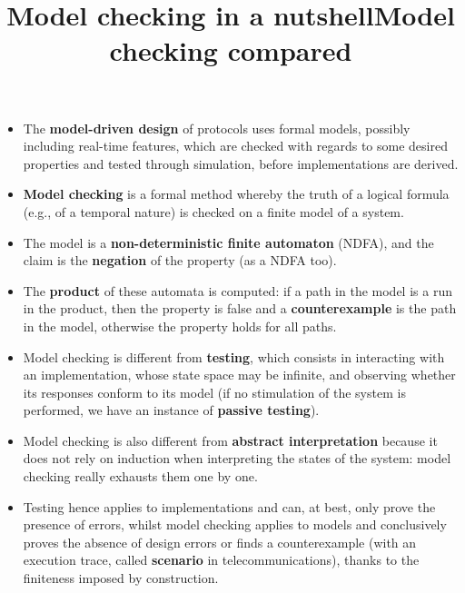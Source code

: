 \documentclass[wide]{slides}
\begin{document}
\begin{slide}
  \title{Model checking in a nutshell}

  \begin{itemize}

    \item The \textbf{model-driven design} of protocols uses formal
      models, possibly including real\hyp{}time features, which are
      checked with regards to some desired properties and tested
      through simulation, before implementations are derived.

    \item \textbf{Model checking} is a formal method whereby the truth
      of a logical formula (e.g., of a temporal nature) is checked on
      a finite model of a system.

    \item The model is a \textbf{non\hyp{}deterministic finite
      automaton} (NDFA), and the claim is the \textbf{negation} of the
      property (as a NDFA too).

    \item The \textbf{product} of these automata is computed: if a
      path in the model is a run in the product, then the property is
      false and a \textbf{counterexample} is the path in the model,
      otherwise the property holds for all paths.

  \end{itemize}
\end{slide}

\begin{slide}
  \title{Model checking compared}

  \begin{itemize}

    \item Model checking is different from \textbf{testing}, which
      consists in interacting with an implementation, whose state
      space may be infinite, and observing whether its responses
      conform to its model (if no stimulation of the system is
      performed, we have an instance of \textbf{passive testing}).

    \item Model checking is also different from \textbf{abstract
      interpretation} because it does not rely on induction when
      interpreting the states of the system: model checking really
      exhausts them one by one.

    \item Testing hence applies to implementations and can, at best,
      only prove the presence of errors, whilst model checking applies
      to models and conclusively proves the absence of design errors
      or finds a counterexample (with an execution trace, called
      \textbf{scenario} in telecommunications), thanks to the
      finiteness imposed by construction.

  \end{itemize}

\end{slide}
\end{document}
